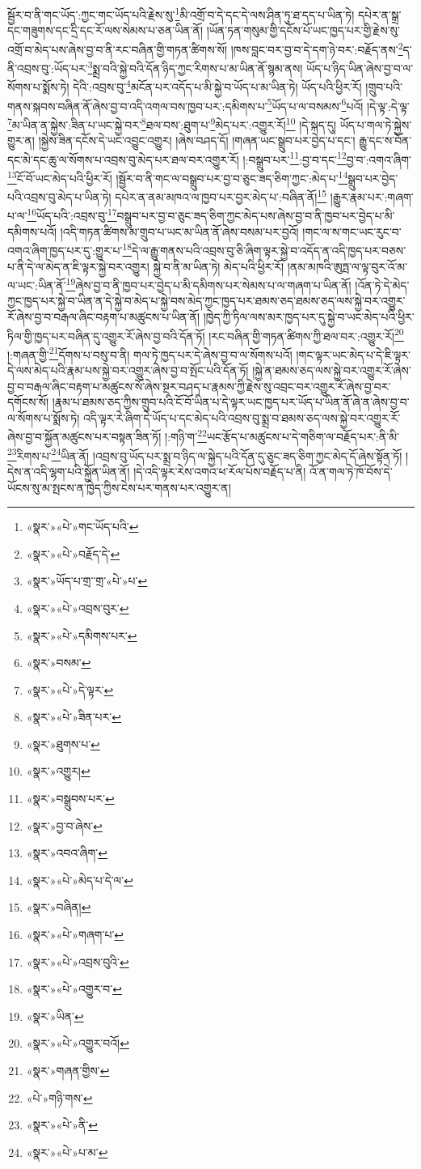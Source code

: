 སྦྱོར་བ་ནི་གང་ཡོད་:ཀྱང་གང་ཡོད་པའི་རྗེས་སུ་\footnote{«སྣར་»«པེ་»གང་ཡོད་པའི་}མི་འགྲོ་བ་དེ་དང་དེ་ལས་ཤིན་ཏུ་ཐ་དད་པ་ཡིན་ཏེ། དཔེར་ན་སྒྲ་དང་གཟུགས་དང་དྲི་དང་རོ་ལས་སེམས་པ་ཅན་ཡིན་ནོ། །ཡོན་ཏན་གསུམ་གྱི་དངོས་པོ་ཡང་ཁྱད་པར་གྱི་རྗེས་སུ་འགྲོ་བ་མེད་པས་ཞེས་བྱ་བ་ནི་རང་བཞིན་གྱི་གཏན་ཚིགས་སོ། །ཁས་བླང་བར་བྱ་བ་དེ་དག་ཉེ་བར་:བརྗོད་ནས་\footnote{«སྣར་»«པེ་»བརྗོད་དེ་}ད་ནི་འབྲས་བུ་:ཡོད་པར་\footnote{«སྣར་»ཡོད་པ་གྲ་་གྲ་«པེ་»པ་}སྨྲ་བའི་སྐྱེ་བའི་དོན་ཉིད་ཀྱང་རིགས་པ་མ་ཡིན་ནོ་སྙམ་ནས། ཡོད་པ་ཉིད་ཡིན་ཞེས་བྱ་བ་ལ་སོགས་པ་སྨོས་ཏེ། དེའི་:འབྲས་བུ་\footnote{«སྣར་»«པེ་»འབྲས་བུར་}མངོན་པར་འདོད་པ་མི་སྐྱེ་བ་ཡོད་པ་མ་ཡིན་ཏེ། ཡོད་པའི་ཕྱིར་རོ། །གྲུབ་པའི་གནས་སྐབས་བཞིན་ནོ་ཞེས་བྱ་བ་འདི་འགལ་བས་ཁྱབ་པར་:དམིགས་པ་\footnote{«སྣར་»«པེ་»དམིགས་པར་}ཡོད་པ་ལ་བསམས་\footnote{«སྣར་»བསམ་}པའོ། །དེ་ལྟ་:དེ་ལྟ་\footnote{«སྣར་»«པེ་»དེ་ལྟར་}མ་ཡིན་ན་སྐྱེས་:ཟིན་པ་ཡང་སྐྱེ་བར་\footnote{«སྣར་»«པེ་»ཟིན་པར་}ཐལ་བས་:ཐུག་པ་\footnote{«སྣར་»ཐུགས་པ་}མེད་པར་:འགྱུར་རོ།\footnote{«སྣར་»འགྱུར།} །དེ་སྐད་དུ། ཡོད་པ་གལ་ཏེ་སྐྱེས་གྱུར་ན། །སྐྱེས་ཟིན་དངོས་དེ་ཡང་འབྱུང་འགྱུར། །ཞེས་བཤད་དོ། །གཞན་ཡང་སྒྲུབ་པར་བྱེད་པ་དང་། རྒྱུ་དང་ས་བོན་དང་མེ་དང་ཆུ་ལ་སོགས་པ་འབྲས་བུ་མེད་པར་ཐལ་བར་འགྱུར་རོ། །:བསྒྲུབ་པར་\footnote{«སྣར་»བསྒྲུབས་པར་}:བྱ་བ་དང་\footnote{«སྣར་»བྱ་བ་ཞེས་}བྱ་བ་:འགའ་ཞིག་\footnote{«སྣར་»འབའ་ཞིག་}ངོ་བོ་ཡང་མེད་པའི་ཕྱིར་རོ། །སྦྱོར་བ་ནི་གང་ལ་བསྒྲུབ་པར་བྱ་བ་ཅུང་ཟད་ཅིག་ཀྱང་:མེད་པ་\footnote{«སྣར་»«པེ་»མེད་པ་དེ་ལ་}སྒྲུབ་པར་བྱེད་པའི་འབྲས་བུ་མེད་པ་ཡིན་ཏེ། དཔེར་ན་ནམ་མཁའ་ལ་ཁྱབ་པར་བྱར་མེད་པ་:བཞིན་ནོ།\footnote{«སྣར་»བཞིན།} །རྒྱུར་རྣམ་པར་:གཞག་པ་ལ་\footnote{«སྣར་»«པེ་»གཞག་པ་}ཡོད་པའི་:འབྲས་བུ་\footnote{«སྣར་»«པེ་»འབྲས་བུའི་}བསྒྲུབ་པར་བྱ་བ་ཅུང་ཟད་ཅིག་ཀྱང་མེད་པས་ཞེས་བྱ་བ་ནི་ཁྱབ་པར་བྱེད་པ་མི་དམིགས་པའོ། །འདི་གཏན་ཚིགས་མ་གྲུབ་པ་ཡང་མ་ཡིན་ནོ་ཞེས་བསམ་པར་བྱའོ། །གང་ལ་ས་གང་ཡང་རུང་བ་འགའ་ཞིག་ཁྱད་པར་དུ་:གྱུར་པ་\footnote{«སྣར་»«པེ་»འགྱུར་བ་}དེ་ལ་རྒྱུ་གནས་པའི་འབྲས་བུ་ཅི་ཞིག་ལྟར་སྐྱེ་བ་འདོད་ན་འདི་ཁྱད་པར་བཅས་པ་ནི་དེ་ལ་མེད་ན་ཇི་ལྟར་སྐྱེ་བར་འགྱུར། སྐྱེ་བ་ནི་མ་ཡིན་ཏེ། མེད་པའི་ཕྱིར་རོ། །ནམ་མཁའི་ཨུཏྤ་ལ་ལྟ་བུར་འོ་མ་ལ་ཡང་:ཡིན་ནོ་\footnote{«སྣར་»ཡིན་}ཞེས་བྱ་བ་ནི་ཁྱབ་པར་བྱེད་པ་མི་དམིགས་པར་སེམས་པ་ལ་གཞག་པ་ཡིན་ནོ། །འོན་ཏེ་དེ་མེད་ཀྱང་ཁྱད་པར་སྐྱེ་བ་ཡིན་ན་དེ་སྐྱེ་བ་མེད་པ་སྐྱེ་བས་མེད་ཀྱང་ཁྱད་པར་ཐམས་ཅད་ཐམས་ཅད་ལས་སྐྱེ་བར་འགྱུར་རོ་ཞེས་བྱ་བ་བརྒལ་ཞིང་བརྟག་པ་མཚུངས་པ་ཡིན་ནོ། །ཁྱེད་ཀྱི་ཏིལ་ལས་མར་ཁྱད་པར་དུ་སྐྱེ་བ་ཡང་མེད་པའི་ཕྱིར་ཏིལ་གྱི་ཁྱད་པར་བཞིན་དུ་འགྱུར་རོ་ཞེས་བྱ་བའི་དོན་ཏོ། །རང་བཞིན་གྱི་གཏན་ཚིགས་ཀྱི་ཐལ་བར་:འགྱུར་རོ།\footnote{«སྣར་»«པེ་»འགྱུར་བའོ།} །:གཞན་གྱི་\footnote{«སྣར་»གཞན་གྱིས་}དོགས་པ་བསུ་བ་ནི། གལ་ཏེ་ཁྱད་པར་དེ་ཞེས་བྱ་བ་ལ་སོགས་པའོ། །གང་ལྟར་ཡང་མེད་པ་དེ་ཇི་ལྟར་དེ་ལས་མེད་པའི་རྣམ་པས་སྐྱེ་བར་འགྱུར་ཞེས་བྱ་བ་སྤོང་པའི་དོན་ཏོ། །སྐྱེ་ན་ཐམས་ཅད་ལས་སྐྱེ་བར་འགྱུར་རོ་ཞེས་བྱ་བ་བརྒལ་ཞིང་བརྟག་པ་མཚུངས་སོ་ཞེས་སྔར་བཤད་པ་རྣམས་ཀྱི་རྗེས་སུ་འབྲང་བར་འགྱུར་རོ་ཞེས་བྱ་བར་དགོངས་སོ། །རྣམ་པ་ཐམས་ཅད་ཀྱིས་གྲུབ་པའི་ངོ་བོ་ཡིན་པ་དེ་ལྟར་ཡང་ཁྱད་པར་ཡོད་པ་ཡིན་ནོ་ཞེ་ན་ཞེས་བྱ་བ་ལ་སོགས་པ་སྨོས་ཏེ། འདི་ལྟར་རེ་ཞིག་དེ་ཡོད་པ་དང་མེད་པའི་འབྲས་བུ་སྨྲ་བ་ཐམས་ཅད་ལས་སྐྱེ་བར་འགྱུར་རོ་ཞེས་བྱ་བ་སྐྱོན་མཚུངས་པར་བསྟན་ཟིན་ཏོ། །:གཉི་ག་\footnote{«པེ་»གཉི་གས་}ཡང་རྩོད་པ་མཚུངས་པ་དེ་གཅིག་ལ་བརྗོད་པར་:ནི་མི་\footnote{«སྣར་»«པེ་»ནི་}རིགས་པ་\footnote{«སྣར་»«པེ་»པ་མ་}ཡིན་ནོ། །འབྲས་བུ་ཡོད་པར་སྨྲ་བ་ཉིད་ལ་སྐྱེད་པའི་དོན་དུ་ཅུང་ཟད་ཅིག་ཀྱང་མེད་དོ་ཞེས་སྟོན་ཏོ། །དེས་ན་འདི་ལྷག་པའི་སྐྱོན་ཡིན་ནོ། །དེ་འདི་ལྟར་རེས་འགའ་ཕ་རོལ་པོས་བརྗོད་པ་ནི། འོ་ན་གལ་ཏེ་ཁོ་བོས་དེ་ཡོངས་སུ་མ་སྤངས་ན་ཁྱེད་ཀྱིས་ངེས་པར་གནས་པར་འགྱུར་ན། 